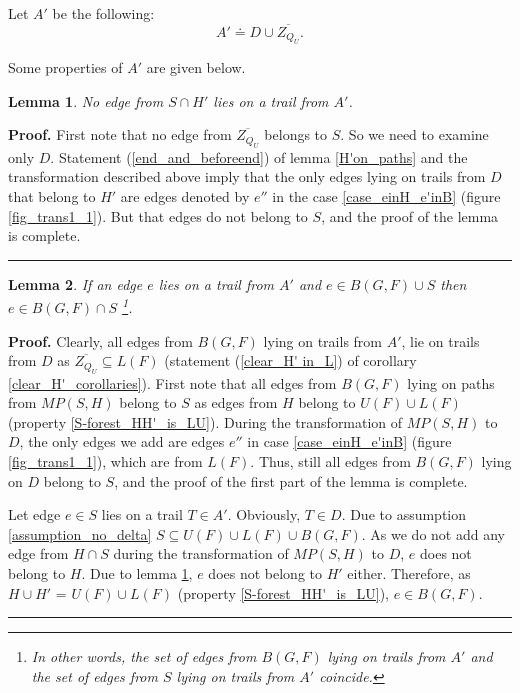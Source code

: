 \documentclass[a4paper, 12pt]{article}
\newtheorem{lemma}{Lemma}[subsection]
\newenvironment{proof}[1][Proof]{\noindent\textbf{#1.} }{\ \rule{0.5em}{0.5em}}
\begin{document}
Let $A'$ be the following:
$$A' \doteq D \cup \overline{Z_{Q_U}}.$$

\bigskip

Some properties of $A'$ are given below.

\begin{lemma} \label{S_cap_H'_is_empty}
No edge from $S \cap H'$ lies on a trail from $A'$.
\end{lemma}
\begin{proof}
First note that no edge from $\overline{Z_{Q_U}}$ belongs to $S$. So
we need to examine only $D$. Statement (\ref{end_and_beforeend}) of
lemma \ref{H'on_paths} and the transformation described above imply
that the only edges lying on trails from $D$ that belong to $H'$ are
edges denoted by $e''$ in the case \ref{case_einH_e'inB} (figure
\ref{fig_trans1_1}). But that edges do not belong to $S$, and the
proof of the lemma is complete.
\end{proof}

\begin{lemma} \label{S_and_B_are_the_same}
If an edge $e$ lies on a trail from $A'$  and $e \in B(G,F) \cup S$
then $e \in B(G,F) \cap S$ \footnote{In other words, the set of
edges from $B(G,F)$ lying on trails from $A'$ and the set of edges
from $S$ lying on trails from $A'$ coincide.}.
\end{lemma}
\begin{proof}
Clearly, all edges from $B(G,F)$ lying on trails from $A'$, lie on
trails from $D$ as $\overline{Z_{Q_U}} \subseteq L(F)$ (statement
(\ref{clear_H' in_L}) of corollary \ref{clear_H'_corollaries}).
First note that all edges from $B(G,F)$ lying on paths from
$MP(S,H)$ belong to $S$ as edges from $H$ belong to $U(F) \cup L(F)$
(property \ref{S-forest_HH'_is_LU}). During the transformation of
$MP(S,H)$ to $D$, the only edges we add are edges $e''$ in case
\ref{case_einH_e'inB} (figure \ref{fig_trans1_1}), which are from
$L(F)$. Thus, still all edges from $B(G,F)$ lying on $D$ belong to
$S$, and the proof of the first part of the lemma is complete.

Let edge $e \in S$ lies on a trail $T \in A'$. Obviously, $T \in D$.
Due to assumption \ref{assumption_no_delta} $S \subseteq U(F) \cup
L(F) \cup B(G,F)$. As we do not add any edge from $H \cap S$ during
the transformation of $MP(S,H)$ to $D$, $e$ does not belong to $H$.
Due to lemma \ref{S_cap_H'_is_empty}, $e$ does not belong to $H'$
either. Therefore, as $H \cup H'$ = $U(F) \cup L(F)$ (property
\ref{S-forest_HH'_is_LU}), $e \in B(G,F)$.
\end{proof}
\end{document}
